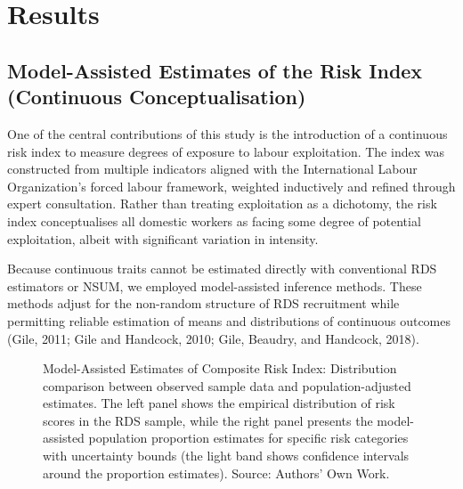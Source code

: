 \documentclass[
  12pt,
  letterpaper,
  DIV=11,
  numbers=noendperiod]{scrartcl}
\theoremstyle{plain}
\theoremstyle{definition}
\begin{document}
\section{Results}\label{results}

\subsection{Model-Assisted Estimates of the Risk Index (Continuous
Conceptualisation)}\label{model-assisted-estimates-of-the-risk-index-continuous-conceptualisation}

One of the central contributions of this study is the introduction of a
continuous risk index to measure degrees of exposure to labour
exploitation. The index was constructed from multiple indicators aligned
with the International Labour Organization's forced labour framework,
weighted inductively and refined through expert consultation. Rather
than treating exploitation as a dichotomy, the risk index conceptualises
all domestic workers as facing some degree of potential exploitation,
albeit with significant variation in intensity.

Because continuous traits cannot be estimated directly with conventional
RDS estimators or NSUM, we employed model-assisted inference methods.
These methods adjust for the non-random structure of RDS recruitment
while permitting reliable estimation of means and distributions of
continuous outcomes (Gile, 2011; Gile and Handcock, 2010; Gile, Beaudry,
and Handcock, 2018).

\begin{figure}[H]


\caption{\label{fig-ma-risk-estimates}Model-Assisted Estimates of
Composite Risk Index: Distribution comparison between observed sample
data and population-adjusted estimates. The left panel shows the
empirical distribution of risk scores in the RDS sample, while the right
panel presents the model-assisted population proportion estimates for
specific risk categories with uncertainty bounds (the light band shows
confidence intervals around the proportion estimates). Source: Authors'
Own Work.}

\end{figure}%
\end{document}
